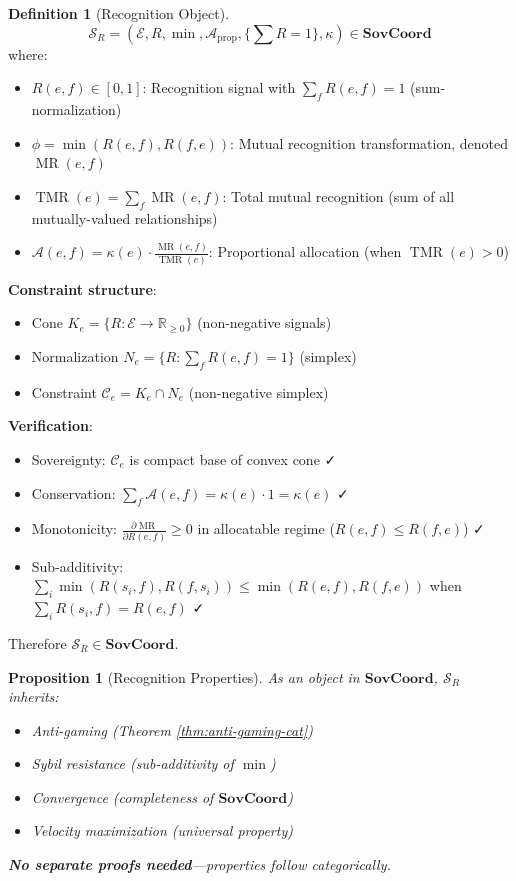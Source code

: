 \documentclass[11pt,a4paper]{article}
\newtheorem{proposition}[theorem]{Proposition}
\theoremstyle{definition}
\newtheorem{definition}[theorem]{Definition}
\theoremstyle{remark}
\newcommand{\E}{\mathcal{E}}
\newcommand{\A}{\mathcal{A}}
\newcommand{\C}{\mathcal{C}}
\newcommand{\SovCoord}{\mathbf{SovCoord}}
\DeclareMathOperator{\MR}{MR}
\DeclareMathOperator{\TMR}{TMR}
\begin{document}
\begin{definition}[Recognition Object]
\[ \mathcal{S}_R = (\E, R, \min, \A_{\text{prop}}, \{\sum R = 1\}, \kappa) \in \SovCoord \]
where:
\begin{itemize}
\item $R(e,f) \in [0,1]$: Recognition signal with $\sum_f R(e,f) = 1$ (sum-normalization)
\item $\phi = \min(R(e,f), R(f,e))$: Mutual recognition transformation, denoted $\MR(e,f)$
\item $\TMR(e) = \sum_f \MR(e,f)$: Total mutual recognition (sum of all mutually-valued relationships)
\item $\A(e,f) = \kappa(e) \cdot \frac{\MR(e,f)}{\TMR(e)}$: Proportional allocation (when $\TMR(e) > 0$)
\end{itemize}

\textbf{Constraint structure}:
\begin{itemize}
\item Cone $K_e = \{R: \E \to \mathbb{R}_{\ge 0}\}$ (non-negative signals)
\item Normalization $N_e = \{R : \sum_f R(e,f) = 1\}$ (simplex)
\item Constraint $\C_e = K_e \cap N_e$ (non-negative simplex)
\end{itemize}

\textbf{Verification}: 
\begin{itemize}
\item Sovereignty: $\C_e$ is compact base of convex cone ✓
\item Conservation: $\sum_f \A(e,f) = \kappa(e) \cdot 1 = \kappa(e)$ ✓
\item Monotonicity: $\frac{\partial \MR}{\partial R(e,f)} \ge 0$ in allocatable regime ($R(e,f) \le R(f,e)$) ✓
\item Sub-additivity: $\sum_i \min(R(s_i,f), R(f,s_i)) \le \min(R(e,f), R(f,e))$ when $\sum_i R(s_i,f) = R(e,f)$ ✓
\end{itemize}

Therefore $\mathcal{S}_R \in \SovCoord$.
\end{definition}

\begin{proposition}[Recognition Properties]
As an object in $\SovCoord$, $\mathcal{S}_R$ inherits:
\begin{itemize}
\item Anti-gaming (Theorem \ref{thm:anti-gaming-cat})
\item Sybil resistance (sub-additivity of $\min$)
\item Convergence (completeness of $\SovCoord$)
\item Velocity maximization (universal property)
\end{itemize}

\textbf{No separate proofs needed}—properties follow categorically.
\end{proposition}
\end{document}

